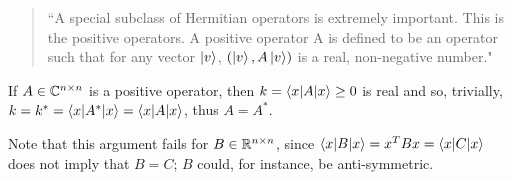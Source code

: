 \documentclass[all.tex]{subfiles}
\begin{document}
\ignorespaces
\parindent 0pt
%
%
\begin{quote}
``A special subclass of Hermitian operators is extremely important. This is the
positive operators. A positive operator A is defined to be an operator such that
for any vector $\ket{v}$, $\left( \ket{v}, A \ket{v} \right)$ is a real,
non-negative number."
\end{quote}
\par If $A \in \mathbb{C}^{n \times n}$ is a positive operator, then $k =
\braket{x|A|x} \ge 0$ is real and so, trivially, $k = k^* = \braket{x|A^*|x} =
\braket{x|A|x}$, thus $A = A^*$.

\par Note that this argument fails for $B \in \mathbb{R}^{n \times n}$, since
$\braket{x|B|x} = x^T B x = \braket{x|C|x}$ does not imply that $B = C$; $B$
could, for instance, be anti-symmetric.
\end{document}
